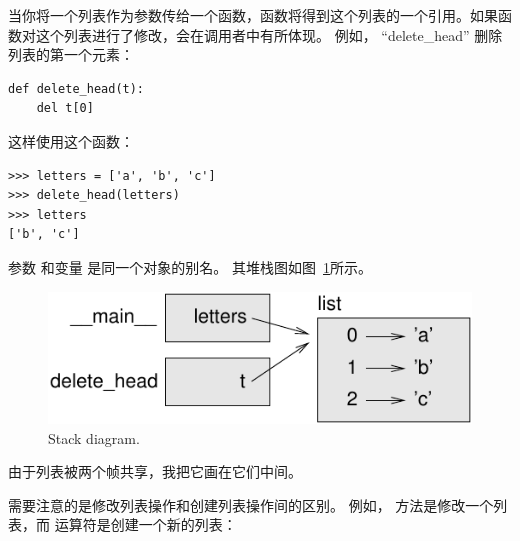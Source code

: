 当你将一个列表作为参数传给一个函数，函数将得到这个列表的一个引用。如果函数对这个列表进行了修改，会在调用者中有所体现。 例如， ``delete\_head'' 删除列表的第一个元素：

\begin{lstlisting}
def delete_head(t):
    del t[0]
\end{lstlisting}

%

这样使用这个函数：

\begin{lstlisting}
>>> letters = ['a', 'b', 'c']
>>> delete_head(letters)
>>> letters
['b', 'c']
\end{lstlisting}

%

参数  和变量  是同一个对象的别名。
其堆栈图如图~\ref{fig.stack5}所示。

  

\begin{figure}
\centerline
{\includegraphics[scale=0.8]{../source/figs/stack5.pdf}}
\caption{Stack diagram.}
\label{fig.stack5}
\end{figure}


由于列表被两个帧共享，我把它画在它们中间。


需要注意的是修改列表操作和创建列表操作间的区别。
例如， 方法是修改一个列表，而 \li{+} 运算符是创建一个新的列表：

  
  


